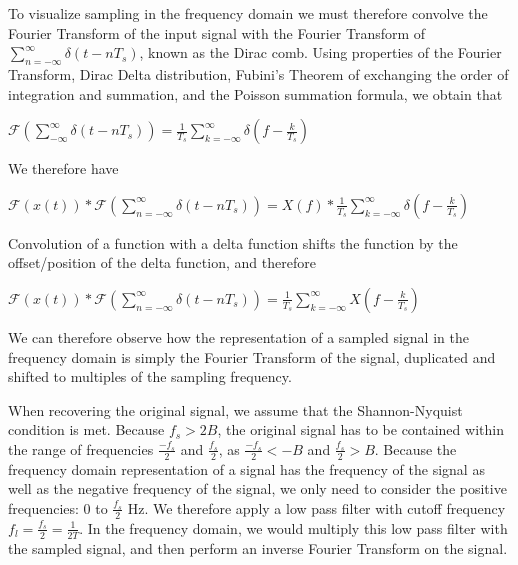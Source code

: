\documentclass{article}
\begin{document}
To visualize sampling in the frequency domain we must therefore convolve the Fourier Transform of the input signal with the Fourier Transform of $\displaystyle\sum_{n=-\infty}^{\infty} \delta (t-nT_s)$, known as the Dirac comb.
Using properties of the Fourier Transform, Dirac Delta distribution, Fubini's Theorem of exchanging the order of integration and summation, 
and the Poisson summation formula, 
we obtain that 
\begin{center}
    \begin{math}
        \mathcal{F}\left(\displaystyle\sum_{-\infty}^{\infty} \delta (t-nT_s)\right) = \frac{1}{T_s} \displaystyle\sum_{k = -\infty}^{\infty} \delta \left( f - \frac{k}{T_s} \right)
    \end{math}  
\end{center}
We therefore have
\begin{center}
    \begin{math}
        \mathcal{F}(x(t)) * \mathcal{F}\left(\displaystyle \sum_{n=-\infty}^{\infty} \delta (t-nT_s) \right) = X(f) * \frac{1}{T_s}\displaystyle \sum_{k = -\infty}^{\infty} \delta \left( f - \frac{k}{T_s} \right)
    \end{math}  
\end{center}
Convolution of a function with a delta function shifts the function by the offset/position of the delta function, and therefore 
\begin{center}
    \begin{math}
        \mathcal{F}(x(t)) * \mathcal{F}\left(\displaystyle \sum_{n=-\infty}^{\infty} \delta (t-nT_s) \right) 
        = 
        \frac{1}{T_s} \displaystyle\sum_{k=-\infty}^{\infty}X\left(f - \frac{k}{T_s} \right)
    \end{math}  
\end{center}

We can therefore observe how the representation of a sampled signal in the frequency domain is simply the Fourier Transform of the signal, duplicated and shifted to multiples of the sampling frequency.

When recovering the original signal, we assume that the Shannon-Nyquist condition is met. 
Because $f_s > 2B$, the original signal has to be contained within the range of frequencies $\frac{-f_s}{2}$ and $\frac{f_s}{2}$, as $\frac{-f_s}{2} < -B$ and  $\frac{f_s}{2} > B$. 
Because the frequency domain representation of a signal has the frequency of the signal as well as the negative frequency of the signal, we only need to consider the positive frequencies: $0$ to $\frac{f_s}{2}$ Hz. %
We therefore apply a low pass filter with cutoff frequency $f_l = \frac{f_s}{2} = \frac{1}{2T}$.
In the frequency domain, we would multiply this low pass filter with the sampled signal, and then perform an inverse Fourier Transform on the signal.
\end{document}
